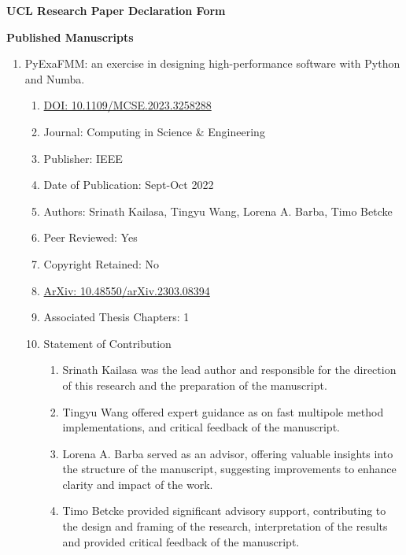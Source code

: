 \thispagestyle{plain}

\begin{center}
    \textbf{UCL Research Paper Declaration Form}
\end{center}

\textbf{Published Manuscripts}

\begin{enumerate}
    \item PyExaFMM: an exercise in designing high-performance software with Python and Numba.
    \begin{enumerate}[label=\alph*)]
      \item \href{https://ieeexplore.ieee.org/document/10124108}{DOI: 10.1109/MCSE.2023.3258288}
      \item Journal: Computing in Science \& Engineering
      \item Publisher: IEEE
      \item Date of Publication: Sept-Oct 2022
      \item Authors: Srinath Kailasa, Tingyu Wang, Lorena A. Barba, Timo Betcke
      \item Peer Reviewed: Yes
      \item Copyright Retained: No
      \item \href{https://doi.org/10.48550/arXiv.2303.08394}{ArXiv: 10.48550/arXiv.2303.08394}
      \item Associated Thesis Chapters: 1
      \item Statement of Contribution
      \begin{enumerate}
        \item Srinath Kailasa was the lead author and responsible for the direction of this research and the preparation of the manuscript.
        \item Tingyu Wang offered expert guidance as on fast multipole method implementations, and critical feedback of the manuscript.
        \item Lorena A. Barba served as an advisor, offering valuable insights into the structure of the manuscript, suggesting improvements to enhance clarity and impact of the work.
        \item Timo Betcke provided significant advisory support, contributing to the design and framing of the research, interpretation of the results and provided critical feedback of the manuscript.
      \end{enumerate}
    \end{enumerate}
\end{enumerate}

